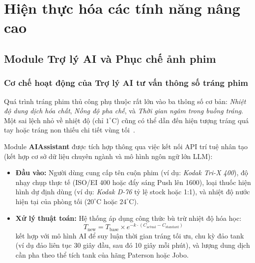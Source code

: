 \section{Hiện thực hóa các tính năng nâng cao}

\subsection{Module Trợ lý AI và Phục chế ảnh phim}

\subsubsection{Cơ chế hoạt động của Trợ lý AI tư vấn thông số tráng phim}
Quá trình tráng phim thủ công phụ thuộc rất lớn vào ba thông số cơ bản: \textit{Nhiệt độ dung dịch hóa chất}, \textit{Nồng độ pha chế}, và \textit{Thời gian ngâm trong buồng tráng}. Một sai lệch nhỏ về nhiệt độ (chỉ $1^\circ\text{C}$) cũng có thể dẫn đến hiện tượng tráng quá tay hoặc tráng non thiếu chi tiết vùng tối~\cite{rogers2023sustainable}.

Module \textbf{AIAssistant} được tích hợp thông qua việc kết nối API trí tuệ nhân tạo (kết hợp cơ sở dữ liệu chuyên ngành và mô hình ngôn ngữ lớn LLM):
\begin{itemize}[leftmargin=2em]
    \item \textbf{Đầu vào:} Người dùng cung cấp tên cuộn phim (ví dụ: \textit{Kodak Tri-X 400}), độ nhạy chụp thực tế (ISO/EI 400 hoặc đẩy sáng Push lên 1600), loại thuốc hiện hình dự định dùng (ví dụ: \textit{Kodak D-76} tỷ lệ stock hoặc 1:1), và nhiệt độ nước hiện tại của phòng tối ($20^\circ\text{C}$ hoặc $24^\circ\text{C}$).
    \item \textbf{Xử lý thuật toán:} Hệ thống áp dụng công thức bù trừ nhiệt độ hóa học:
    \begin{equation}
        T_{\text{new}} = T_{\text{base}} \times e^{-k \cdot (C_{\text{actual}} - C_{\text{standard}})}
    \end{equation}
    kết hợp với mô hình AI để suy luận thời gian tráng tối ưu, chu kỳ đảo tank (ví dụ đảo liên tục 30 giây đầu, sau đó 10 giây mỗi phút), và lượng dung dịch cần pha theo thể tích tank của hãng Paterson hoặc Jobo.
\end{itemize}

